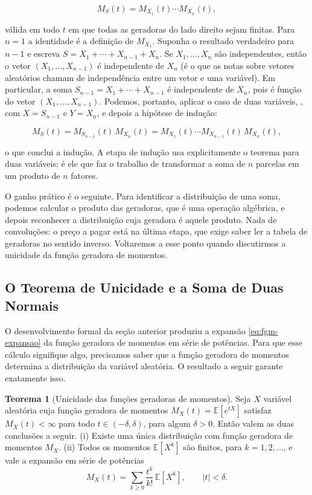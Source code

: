 \documentclass[12pt,portuguese]{article}
\theoremstyle{definition}
\newtheorem{theorem}{Teorema}
\theoremstyle{plainexercise}
\theoremstyle{starredexercise}
\theoremstyle{definition}
\begin{document}
\begin{equation}\label{eq:fgm-produto-n}
M_S(t) = M_{X_1}(t)\cdots M_{X_n}(t),
\end{equation}

\noindent válida em todo $t$ em que todas as geradoras do lado direito sejam
finitas. Para $n=1$ a identidade é a definição de $M_{X_1}$. Suponha o
resultado verdadeiro para $n-1$ e escreva $S=X_1+\cdots+X_{n-1}+X_n$. Se
$X_1,\dots,X_n$ são independentes, então o vetor $(X_1,\dots,X_{n-1})$ é
independente de $X_n$ (é o que as notas sobre vetores aleatórios chamam de
independência entre um vetor e uma variável). Em particular, a soma
$S_{n-1}=X_1+\cdots+X_{n-1}$ é independente de $X_n$, pois é função do vetor
$(X_1,\dots,X_{n-1})$. Podemos, portanto, aplicar o caso de duas variáveis,
, com $X=S_{n-1}$ e $Y=X_n$, e depois a hipótese de indução:

\[
M_S(t) = M_{S_{n-1}}(t)\,M_{X_n}(t) = M_{X_1}(t)\cdots M_{X_{n-1}}(t)\,M_{X_n}(t),
\]

\noindent o que conclui a indução. A etapa de indução usa explicitamente o
teorema para duas variáveis; é ele que faz o trabalho de transformar a soma de
$n$ parcelas em um produto de $n$ fatores.

O ganho prático é o seguinte. Para identificar a distribuição de uma soma,
podemos calcular o produto das geradoras, que é uma operação algébrica, e depois
reconhecer a distribuição cuja geradora é aquele produto. Nada de convoluções:
o preço a pagar está na última etapa, que exige saber ler a tabela de geradoras
no sentido inverso. Voltaremos a esse ponto quando discutirmos a unicidade da
função geradora de momentos.

\subsection{O Teorema de Unicidade e a Soma de Duas Normais}\label{subsec:fgm-unicidade}

O desenvolvimento formal da seção anterior produziu a expansão
\eqref{eq:fgm-expansao} da função geradora de momentos em série de potências.
Para que esse cálculo signifique algo, precisamos saber que a função geradora
de momentos determina a distribuição da variável aleatória. O resultado a
seguir garante exatamente isso.

\begin{theorem}[Unicidade das funções geradoras de momentos]\label{thm:fgm-unicidade}
  Seja $X$ variável aleatória cuja função geradora de momentos
  $M_X(t)=\mathbb{E}[e^{tX}]$ satisfaz $M_X(t)<\infty$ para todo $t\in (-\delta,\delta)$, 
  para algum $\delta>0$. Então valem as duas conclusões a seguir.
  (i) Existe uma única distribuição com função geradora de momentos $M_X$.
  (ii) Todos os momentos $\mathbb{E}[X^k]$ são finitos, para $k=1,2,\ldots$,
  e vale a expansão em série de potências
  \begin{equation}\label{eq:fgm-serie}
    M_X(t)=\sum_{k\geqslant 0}\frac{t^k}{k!}\,\mathbb{E}[X^k],\qquad |t|<\delta.
  \end{equation}
\end{theorem}
\end{document}
